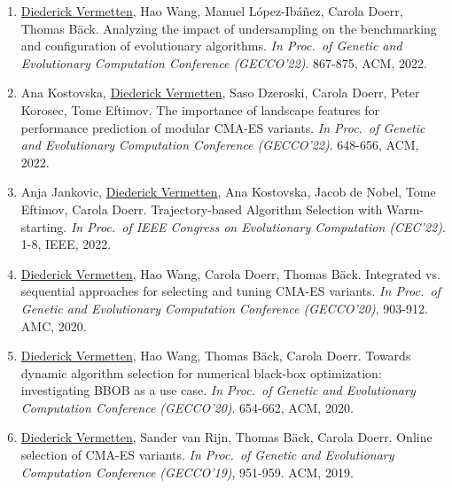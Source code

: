 \begin{enumerate}
        \item \underline{Diederick Vermetten}, Hao Wang, Manuel López-Ibáñez, Carola Doerr, Thomas Bäck. Analyzing the impact of undersampling on the benchmarking and configuration of evolutionary algorithms.
    \emph{In Proc.~of Genetic and Evolutionary Computation Conference (GECCO'22)}. 867-875, ACM, 2022.

        \item Ana Kostovska, \underline{Diederick Vermetten}, Saso Dzeroski, Carola Doerr, Peter Korosec, Tome Eftimov. The importance of landscape features for performance prediction of modular CMA-ES variants.
    \emph{In Proc.~of Genetic and Evolutionary Computation Conference (GECCO'22)}. 648-656, ACM, 2022.

        \item Anja Jankovic, \underline{Diederick Vermetten}, Ana Kostovska, Jacob de Nobel, Tome Eftimov, Carola Doerr. Trajectory-based Algorithm Selection with Warm-starting.
    \emph{In Proc.~of  IEEE Congress on Evolutionary Computation (CEC'22)}. 1-8, IEEE, 2022.
    
        \item \underline{Diederick Vermetten}, Hao Wang, Carola Doerr, Thomas Bäck. Integrated vs. sequential approaches for selecting and tuning CMA-ES variants. 
    \emph{In Proc.~of Genetic and Evolutionary Computation Conference (GECCO'20)}, 903-912. AMC, 2020.

        \item \underline{Diederick Vermetten}, Hao Wang, Thomas Bäck, Carola Doerr. Towards dynamic algorithm selection for numerical black-box optimization: investigating BBOB as a use case. 
    \emph{In Proc.~of Genetic and Evolutionary Computation Conference (GECCO'20)}. 654-662, ACM, 2020.
    
        \item \underline{Diederick Vermetten}, Sander van Rijn, Thomas B{\"{a}}ck, Carola Doerr. Online selection of CMA-ES variants. 
    \emph{In Proc.~of Genetic and Evolutionary Computation Conference (GECCO'19)}, 951-959. ACM, 2019.
\end{enumerate}


